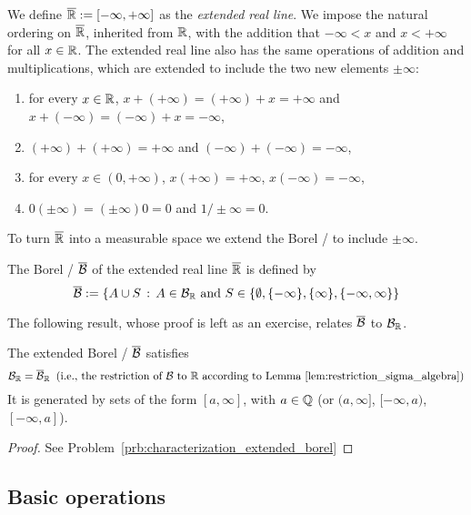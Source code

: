 We define $\overline{\mathbb R} := [-\infty,+\infty]$ as the \emph{extended real line}. We impose the natural ordering on $\overline{\mathbb R}$, inherited from $\mathbb R$, with the addition that $-\infty < x$ and $x < +\infty$ for all $x \in \mathbb R$. The extended real line also has the same operations of addition and multiplications, which are extended to include the two new elements $\pm \infty$:
\begin{enumerate}
\item for every $x\in \mathbb R$, $x + (+\infty) = (+\infty) + x = +\infty$ and $x + (-\infty) = (-\infty) + x = -\infty$,
\item $(+\infty) + (+\infty) = +\infty$ and $(-\infty) + (-\infty) = -\infty$,
\item for every $x \in (0,+\infty)$, $x (+\infty) = +\infty$,\; $x(-\infty) = -\infty$,
\item $0 (\pm \infty) = (\pm \infty) 0 = 0$ and $1/\pm \infty = 0$.
\end{enumerate}
To turn $\overline{\mathbb R}$ into a measurable space we extend the Borel \sigalg/ to include $\pm \infty$.

\begin{definition}
The Borel \sigalg/ $\overline{\mathcal B}$ of the extended real line $\overline{\mathbb R}$ is defined by
\[
	\overline{\mathcal B} := \{A \cup S \, :\, A \in \mathcal B_{\mathbb R} \text{ and } S \in \{\emptyset, \{-\infty\}, \{\infty\}, \{-\infty, \infty\}\}
\]
\end{definition}

The following result, whose proof is left as an exercise, relates $\overline{\mathcal B}$ to $\mathcal B_{\mathbb R}$.

\begin{lemma}\label{lem:characterization_extended_borel}
The extended Borel \sigalg/ $\overline{\mathcal B}$ satisfies
\[
	\mathcal B_{\mathbb R} = \overline{\mathcal B}_{\mathbb R}\;\;\text{(i.e., the restriction of $\mathcal B$ to $\mathbb R$ according to Lemma~\ref{lem:restriction_sigma_algebra})}
\]
It is generated by sets of the form $[a,\infty]$, with $a \in \mathbb Q$ (or $(a,\infty]$, $[-\infty,a)$, $[-\infty,a]$).
\end{lemma}

\begin{proof}
See Problem~\ref{prb:characterization_extended_borel}
\end{proof}

\subsection{Basic operations}

